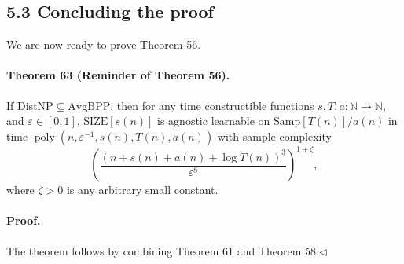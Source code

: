 \documentclass[10pt,a4paper]{article}
\begin{document}
\subsection*{5.3 Concluding the proof}
We are now ready to prove Theorem 56.
\paragraph{Theorem 63 (Reminder of Theorem 56).} If $\mathrm{DistNP}\subseteq\mathrm{AvgBPP}$, then for any time constructible functions $s,T,a:\mathbb N\to\mathbb N$, and $\varepsilon\in[0,1]$, $\mathrm{SIZE}[s(n)]$ is agnostic learnable on $\mathrm{Samp}[T(n)]/a(n)$ in time $\operatorname{poly}(n,\varepsilon^{-1},s(n),T(n),a(n))$ with sample complexity
\[\left(\frac{(n+s(n)+a(n)+\log T(n))^3}{\varepsilon^8}\right)^{1+\zeta},\]
where $\zeta>0$ is any arbitrary small constant.
\paragraph{Proof.} The theorem follows by combining Theorem 61 and Theorem 58.\hfill$\triangleleft$
\end{document}
